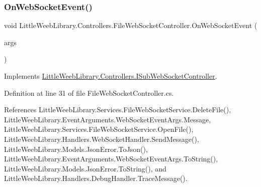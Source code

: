 \subsubsection{\texorpdfstring{On\+Web\+Socket\+Event()}{OnWebSocketEvent()}}
{\footnotesize\ttfamily void Little\+Weeb\+Library.\+Controllers.\+File\+Web\+Socket\+Controller.\+On\+Web\+Socket\+Event (\begin{DoxyParamCaption}\item[{\mbox{\hyperlink{class_little_weeb_library_1_1_event_arguments_1_1_web_socket_event_args}{Web\+Socket\+Event\+Args}}}]{args }\end{DoxyParamCaption})}



Implements \mbox{\hyperlink{interface_little_weeb_library_1_1_controllers_1_1_i_sub_web_socket_controller_adcb26b7b397d6a67ccbf114008c29985}{Little\+Weeb\+Library.\+Controllers.\+I\+Sub\+Web\+Socket\+Controller}}.



Definition at line 31 of file File\+Web\+Socket\+Controller.\+cs.



References Little\+Weeb\+Library.\+Services.\+File\+Web\+Socket\+Service.\+Delete\+File(), Little\+Weeb\+Library.\+Event\+Arguments.\+Web\+Socket\+Event\+Args.\+Message, Little\+Weeb\+Library.\+Services.\+File\+Web\+Socket\+Service.\+Open\+File(), Little\+Weeb\+Library.\+Handlers.\+Web\+Socket\+Handler.\+Send\+Message(), Little\+Weeb\+Library.\+Models.\+Json\+Error.\+To\+Json(), Little\+Weeb\+Library.\+Event\+Arguments.\+Web\+Socket\+Event\+Args.\+To\+String(), Little\+Weeb\+Library.\+Models.\+Json\+Error.\+To\+String(), and Little\+Weeb\+Library.\+Handlers.\+Debug\+Handler.\+Trace\+Message().


